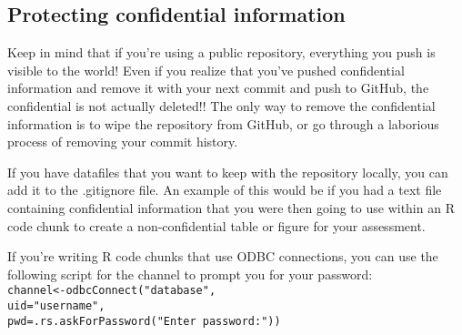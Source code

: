 \documentclass[12pt,]{article}
\begin{document}
\subsection{Protecting confidential
information}\label{protecting-confidential-information}

Keep in mind that if you're using a public repository, everything you
push is visible to the world! Even if you realize that you've pushed
confidential information and remove it with your next commit and push to
GitHub, the confidential is not actually deleted!! The only way to
remove the confidential information is to wipe the repository from
GitHub, or go through a laborious process of removing your commit
history.

If you have datafiles that you want to keep with the repository locally,
you can add it to the .gitignore file. An example of this would be if
you had a text file containing confidential information that you were
then going to use within an R code chunk to create a non-confidential
table or figure for your assessment.

If you're writing R code chunks that use ODBC connections, you can use
the following script for the channel to prompt you for your password:\\
\texttt{channel\textless{}-odbcConnect("database",}\\
\hspace*{0.333em}\hspace*{0.333em}\hspace*{0.333em}\hspace*{0.333em}\hspace*{0.333em}\hspace*{0.333em}\hspace*{0.333em}\hspace*{0.333em}\hspace*{0.333em}\hspace*{0.333em}\hspace*{0.333em}\texttt{uid="username",}\\
\hspace*{0.333em}\hspace*{0.333em}\hspace*{0.333em}\hspace*{0.333em}\hspace*{0.333em}\hspace*{0.333em}\hspace*{0.333em}\hspace*{0.333em}\hspace*{0.333em}\hspace*{0.333em}\hspace*{0.333em}\texttt{pwd=.rs.askForPassword("Enter\ password:"))}
\end{document}
